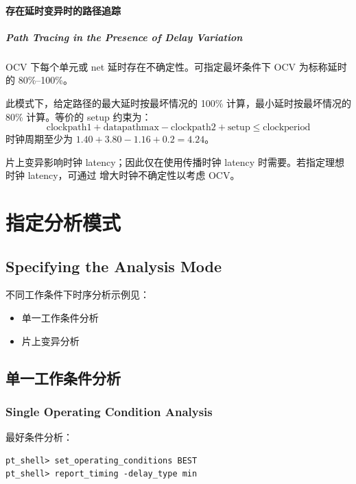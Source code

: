 \paragraph{存在延时变异时的路径追踪}
\subparagraph*{Path Tracing in the Presence of Delay Variation}

OCV 下每个单元或 net 延时存在不确定性。可指定最坏条件下 OCV 为标称延时的 80\%--100\%。


此模式下，给定路径的最大延时按最坏情况的 100\% 计算，最小延时按最坏情况的 80\% 计算。等价的 setup 约束为：
\[
\text{clockpath1} + \text{datapathmax} - \text{clockpath2} + \text{setup} \leq \text{clockperiod}
\]
时钟周期至少为 $1.40 + 3.80 - 1.16 + 0.2 = 4.24$。

\begin{noteBox}
片上变异影响时钟 latency；因此仅在使用传播时钟 latency 时需要。若指定理想时钟 latency，可通过  增大时钟不确定性以考虑 OCV。
\end{noteBox}

\section{指定分析模式}
\subsection*{Specifying the Analysis Mode}

不同工作条件下时序分析示例见：
\begin{itemize}
  \item 单一工作条件分析
  \item 片上变异分析
\end{itemize}

\subsection{单一工作条件分析}
\subsubsection*{Single Operating Condition Analysis}

最好条件分析：
\begin{lstlisting}
pt_shell> set_operating_conditions BEST
pt_shell> report_timing -delay_type min
\end{lstlisting}


